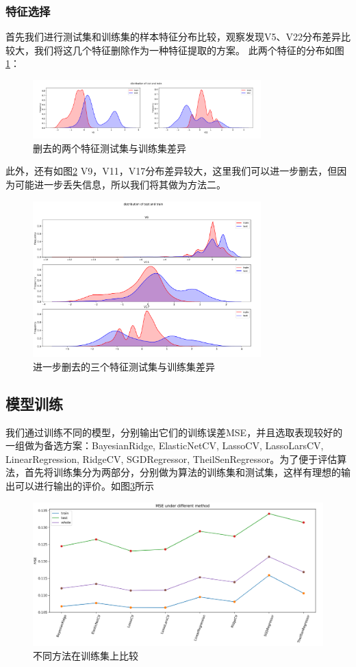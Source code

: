 \documentclass{cjc}
\begin{document}
\subsubsection{特征选择}
首先我们进行测试集和训练集的样本特征分布比较，观察发现V5、V22分布差异比较大，我们将这几个特征删除作为一种特征提取的方案。
此两个特征的分布如图\ref{fig:distri}：
\begin{figure}[htb]
  \centering
  \includegraphics[width=250pt]{fig/distribution.png}
  \caption{删去的两个特征测试集与训练集差异}
  \label{fig:distri}
\end{figure}
此外，还有如图\ref{fig:distri2} V9，V11，V17分布差异较大，这里我们可以进一步删去，但因为可能进一步丢失信息，所以我们将其做为方法二。
\begin{figure}[htb]
  \centering
  \includegraphics[width=250pt]{fig/distribution2.png}
  \caption{进一步删去的三个特征测试集与训练集差异}
  \label{fig:distri2}
\end{figure}

\subsection{模型训练}

我们通过训练不同的模型，分别输出它们的训练误差MSE，并且选取表现较好的一组做为备选方案：BayesianRidge, ElasticNetCV, LassoCV, LassoLarsCV, LinearRegression, RidgeCV, SGDRegressor, TheilSenRegressor。为了便于评估算法，首先将训练集分为两部分，分别做为算法的训练集和测试集，这样有理想的输出可以进行输出的评价。如图\ref{fig:comp}所示
\begin{figure}[htb]
  \centering
  \includegraphics[width=\linewidth]{fig/comparison.png}
  \caption{不同方法在训练集上比较}
  \label{fig:comp}
\end{figure}
\end{document}
